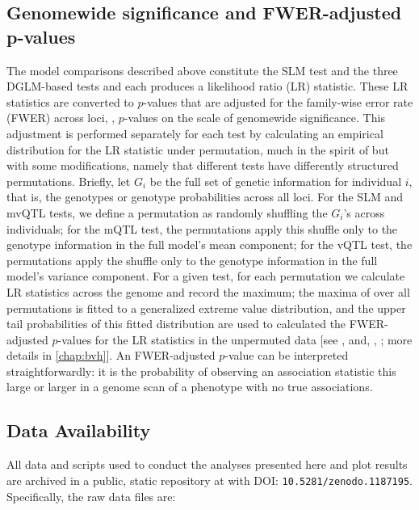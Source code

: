 \subsection{Genomewide significance and FWER-adjusted p-values}

The model comparisons described above constitute the SLM test and the three DGLM-based tests and each produces a likelihood ratio (LR) statistic.
These LR statistics are converted to $p$-values that are adjusted for the family-wise error rate (FWER) across loci, \ie, $p$-values on the scale of genomewide significance.
This adjustment is performed separately for each test by calculating an empirical distribution for the LR statistic under permutation, much in the spirit of \citet{Churchill1994} but with some modifications, namely that different tests have differently structured permutations.
Briefly, let $G_i$ be the full set of genetic information for individual $i$, that is, the genotypes or genotype probabilities across all loci.
For the SLM and mvQTL tests, we define a permutation as randomly shuffling the $G_i$'s across individuals; for the mQTL test, the permutations apply this shuffle only to the genotype information in the full model's mean component; for the vQTL test, the permutations apply the shuffle only to the genotype information in the full model's variance component.
For a given test, for each permutation we calculate LR statistics across the genome and record the maximum; the maxima of over all permutations is fitted to a generalized extreme value distribution, and the upper tail probabilities of this fitted distribution are used to calculated the FWER-adjusted $p$-values for the LR statistics in the unpermuted data [see \citealt{Dudbridge2004}, and, \eg, \citealt{Valdar06cc}; more details in \autoref{chap:bvh}].
An FWER-adjusted $p$-value can be interpreted straightforwardly: it is the probability of observing an association statistic this large or larger in a genome scan of a phenotype with no true associations.

\subsection{Data Availability}

    All data and scripts used to conduct the analyses presented here and plot results are archived in a public, static repository at with DOI: \texttt{10.5281/zenodo.1187195}.
    Specifically, the raw data files are:

